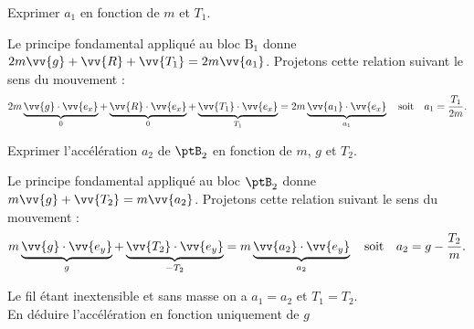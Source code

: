 \debutEntrainement



\begin{enonce}
	 Exprimer $a_1$ en fonction de $m$ et $T_1$. 
\end{enonce}


\begin{corrige}
	Le principe fondamental appliqué au bloc $\text{B}_1$ donne $2m\vv{g}+\vv{R}+\vv{T_1}=2m \vv{a_1}$. Projetons cette relation suivant le sens du mouvement : 
	\[
		2m\underbrace{\vv{g}\cdot\vv{e_x}}_{0}+
		\underbrace{\vv{R}\cdot\vv{e_x}}_{0}+
		\underbrace{\vv{T_1}\cdot\vv{e_x}}_{T_1}=
		2m \underbrace{\vv{a_1}\cdot\vv{e_x}}_{a_1}
		\quad\text{soit}\quad
		a_1=\frac{T_1}{2m}.
	\]
\end{corrige}




\begin{enonce}
	 Exprimer l'accélération $a_2$ de $\ptB_2$ en fonction de $m$, $g$ et $T_2$. 
\end{enonce}


\begin{corrige}
	Le principe fondamental appliqué au bloc $\ptB_2$ donne $m\vv{g}+\vv{T_2}=m \vv{a_2}$. Projetons cette relation suivant le sens du mouvement : 
	\[
		m\underbrace{\vv{g}\cdot\vv{e_y}}_{g}+
		\underbrace{\vv{T_2}\cdot\vv{e_y}}_{-T_2}=
		m \underbrace{\vv{a_2}\cdot\vv{e_y}}_{a_2}
		\quad\text{soit}\quad
		a_2=g-\frac{T_2}{m}.
	\]
\end{corrige}





\begin{enonce}
Le fil étant inextensible et sans masse on a $a_1=a_2$ et $T_1=T_2$. \\En déduire l'accélération en fonction uniquement de $g$
\end{enonce}

